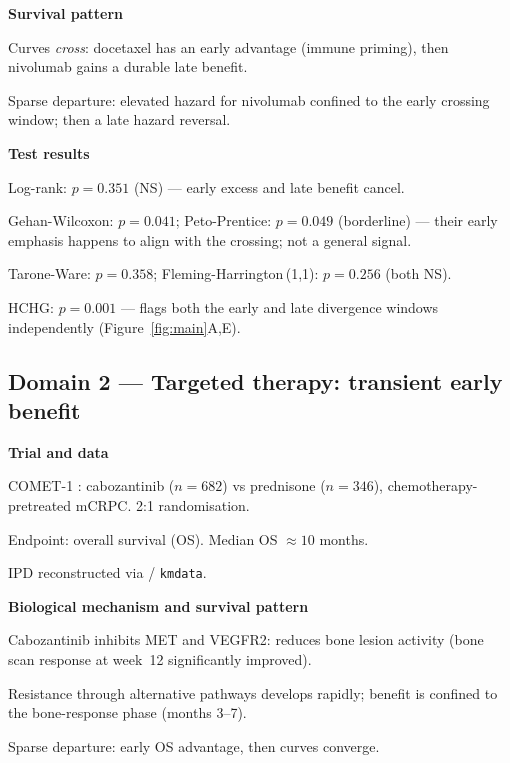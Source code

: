 \documentclass[unnumsec,webpdf,contemporary,large]{oup-authoring-template}
\let\origitemize\itemize
\let\origenditemize\enditemize
\renewenvironment{itemize}{%
  \origitemize
  \setlength{\itemsep}{1pt}%
  \setlength{\parskip}{0pt}%
  \setlength{\topsep}{3pt}%
}{\origenditemize}
\begin{document}
\textbf{Survival pattern}
\begin{itemize}
  \item Curves \emph{cross}: docetaxel has an early advantage (immune
        priming), then nivolumab gains a durable late benefit.
  \item Sparse departure: elevated hazard for nivolumab confined to the
        early crossing window; then a late hazard reversal.
\end{itemize}

\textbf{Test results}
\begin{itemize}
  \item Log-rank: $p = 0.351$ (NS) — early excess and late benefit cancel.
  \item Gehan-Wilcoxon: $p = 0.041$; Peto-Prentice: $p = 0.049$
        (borderline) — their early emphasis happens to align with the
        crossing; not a general signal.
  \item Tarone-Ware: $p = 0.358$; Fleming-Harrington\,(1,1): $p = 0.256$
        (both NS).
  \item HCHG: $p = 0.001$ — flags both the early and late divergence
        windows independently (Figure~\ref{fig:main}A,E).
\end{itemize}


\subsection*{Domain 2 — Targeted therapy: transient early benefit}

\textbf{Trial and data}
\begin{itemize}
  \item COMET-1 \citep{smith2016}: cabozantinib ($n=682$) vs prednisone
        ($n=346$), chemotherapy-pretreated mCRPC. 2:1 randomisation.
  \item Endpoint: overall survival (OS). Median OS $\approx 10$ months.
  \item IPD reconstructed via \citet{guyot2012} / \texttt{kmdata}.
\end{itemize}

\textbf{Biological mechanism and survival pattern}
\begin{itemize}
  \item Cabozantinib inhibits MET and VEGFR2: reduces bone lesion
        activity (bone scan response at week~12 significantly improved).
  \item Resistance through alternative pathways develops rapidly;
        benefit is confined to the bone-response phase (months 3--7).
  \item Sparse departure: early OS advantage, then curves converge.
\end{itemize}
\end{document}
